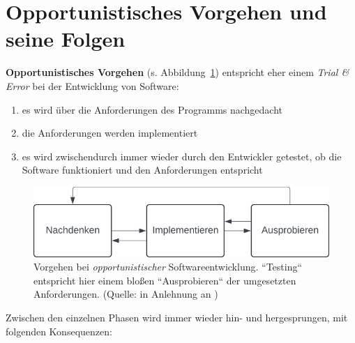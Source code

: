 \section{Opportunistisches Vorgehen und seine Folgen}

\textbf{Opportunistisches Vorgehen} (s. Abbildung~\ref{fig:opportunistischeentwicklung}) entspricht eher einem \textit{Trial \& Error} bei der Entwicklung von Software:

\begin{enumerate}
    \item es wird über die Anforderungen des Programms nachgedacht
    \item die Anforderungen werden implementiert
    \item es wird zwischendurch immer wieder durch den Entwickler getestet, ob die Software funktioniert und den Anforderungen entspricht
\end{enumerate}


\begin{figure}
    \centering
    \includegraphics[scale=0.4]{chapters/Uebersicht ueber die Phasen des Entwicklungszyklus/img/opportunistischeentwicklung}
    \caption{Vorgehen bei \textit{opportunistischer} Softwareentwicklung. ``Testing`` entspricht hier einem bloßen ``Ausprobieren`` der umgesetzten Anforderungen. (Quelle: in Anlehnung an \cite[14, Abb. 2.1]{Wed09})}
    \label{fig:opportunistischeentwicklung}
\end{figure}

\noindent
Zwischen den einzelnen Phasen wird immer wieder hin- und hergesprungen, mit folgenden Konsequenzen:


